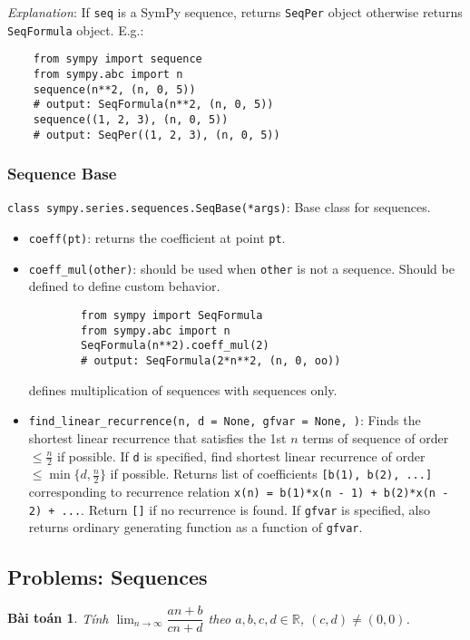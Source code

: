\documentclass{article}
\newtheorem{baitoan}{Bài toán}
\begin{document}
{\it Explanation}: If {\tt seq} is a SymPy sequence, returns {\tt SeqPer} object otherwise returns {\tt SeqFormula} object. E.g.:
\begin{verbatim}
	from sympy import sequence
	from sympy.abc import n
	sequence(n**2, (n, 0, 5))
	# output: SeqFormula(n**2, (n, 0, 5))
	sequence((1, 2, 3), (n, 0, 5))
	# output: SeqPer((1, 2, 3), (n, 0, 5))
\end{verbatim}


\subsubsection{Sequence Base}
{\tt class sympy.series.sequences.SeqBase(*args)}: Base class for sequences.
\begin{itemize}
	\item {\tt coeff(pt)}: returns the coefficient at point {\tt pt}.
	\item \verb|coeff_mul(other)|: should be used when {\tt other} is not a sequence. Should be defined to define custom behavior.
	\begin{verbatim}
		from sympy import SeqFormula			
		from sympy.abc import n			
		SeqFormula(n**2).coeff_mul(2)
		# output: SeqFormula(2*n**2, (n, 0, oo))
	\end{verbatim}
	{\tt*} defines multiplication of sequences with sequences only.
	\item \verb|find_linear_recurrence(n, d = None, gfvar = None, )|: Finds the shortest linear recurrence that satisfies the 1st $n$ terms of sequence of order $\le\frac{n}{2}$ if possible. If {\tt d} is specified, find shortest linear recurrence of order $\le\min\{d,\frac{n}{2}\}$ if possible. Returns list of coefficients {\tt[b(1), b(2), ...]} corresponding to recurrence relation {\tt x(n) = b(1)*x(n - 1) + b(2)*x(n - 2) + ...}. Return {\tt[]} if no recurrence is found. If {\tt gfvar} is specified, also returns ordinary generating function as a function of {\tt gfvar}.
\end{itemize}


\subsection{Problems: Sequences}

\begin{baitoan}
	Tính $\lim_{n\to\infty} \dfrac{an + b}{cn + d}$ theo $a,b,c,d\in\mathbb{R}$, $(c,d)\ne(0,0)$.
\end{baitoan}
\end{document}
